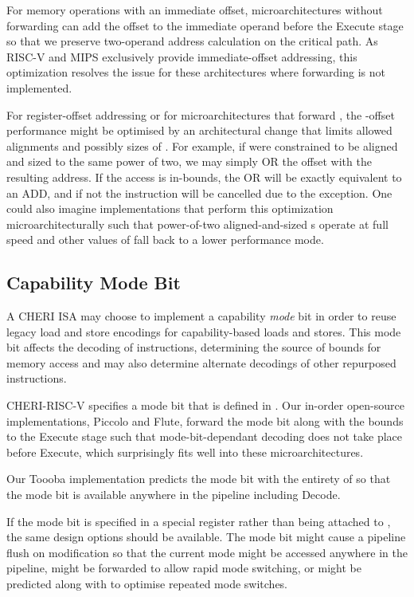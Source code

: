 For memory operations with an immediate offset, microarchitectures without \DDC{} forwarding can add the \DDC{} offset to the immediate operand before the Execute stage so that we preserve two-operand address calculation on the critical path.
As RISC-V and MIPS exclusively provide immediate-offset addressing, this optimization resolves the issue for these architectures where \DDC{} forwarding is not implemented.

For register-offset addressing or for microarchitectures that forward \DDC{}, the \DDC{}-offset performance might be optimised by an architectural change that limits allowed alignments and possibly sizes of \DDC{}.
For example, if \DDC{} were constrained to be aligned and sized to the same power of two, we may simply OR the \DDC{} offset with the resulting address.
If the access is in-bounds, the OR will be exactly equivalent to an ADD, and if not the instruction will be cancelled due to the exception.
One could also imagine implementations that perform this optimization microarchitecturally such that power-of-two aligned-and-sized \DDC{}s operate at full speed and other values of \DDC{} fall back to a lower performance mode.

\subsection{Capability Mode Bit}
A CHERI ISA may choose to implement a capability \emph{mode} bit in order to reuse legacy load and store encodings for capability-based loads and stores.
This mode bit affects the decoding of instructions, determining the source of bounds for memory access and may also determine alternate decodings of other repurposed instructions.

CHERI-RISC-V specifies a mode bit that is defined in \PCC{}.
Our in-order open-source implementations, Piccolo and Flute, forward the mode bit along with the bounds to the Execute stage such that mode-bit-dependant decoding does not take place before Execute, which surprisingly fits well into these microarchitectures.

Our Toooba implementation predicts the mode bit with the entirety of \PCC{} so that the mode bit is available anywhere in the pipeline including Decode.

If the mode bit is specified in a special register rather than being attached to \PCC{}, the same design options should be available.
The mode bit might cause a pipeline flush on modification so that the current mode might be accessed anywhere in the pipeline, might be forwarded to allow rapid mode switching, or might be predicted along with \PCC{} to optimise repeated mode switches.

